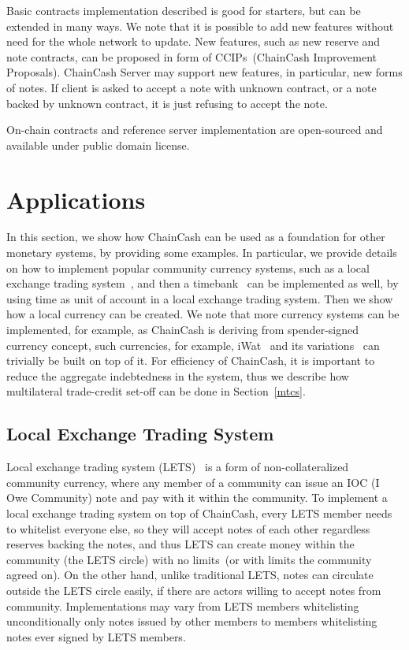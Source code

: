 \documentclass{ifcolog}
\newcommand{\cc}{ChainCash}
\begin{document}

Basic contracts implementation described is good for starters, but can be extended in many ways.  We note that it is possible
to add new features without need for the whole network to update. New features, such as new reserve and note contracts,
can be proposed in form of CCIPs~(ChainCash Improvement Proposals). ChainCash
Server may support new features, in particular, new forms of notes. If client is asked to accept a note with unknown
contract, or a note backed by unknown contract, it is just refusing to accept the note.

On-chain contracts and reference server implementation are open-sourced and available under public domain license.

\section{Applications}
\label{sec-apps}

In this section, we show how \cc{} can be used as a foundation for other monetary systems, by providing some examples.
In particular, we provide details on how to implement popular community currency systems, such as a local exchange trading
 system~\cite{williams1996new}, and then a timebank~\cite{mcquaid2004review} can be implemented as well, by using time
as unit of account in a local exchange trading system. Then we show how a local currency can be created. We note that more currency systems can be
implemented, for example, as \cc{} is deriving from spender-signed currency concept, such currencies, for example,
iWat~\cite{saito2003peer} and its variations~\cite{saito2005wot,saito2005multiplication,saito2006reduction} can
trivially be built on top of it. For efficiency of \cc{}, it is important to reduce the aggregate indebtedness in the system,
thus we describe how multilateral trade-credit set-off can be done in Section~\ref{mtcs}.

\subsection{Local Exchange Trading System}

Local exchange trading system (LETS)~\cite{williams1996new} is a form of non-collateralized community currency, where any member of a community
can issue an IOC (I Owe Community) note and pay with it within the community.
To implement a local exchange trading system on top of \cc{}, every LETS member needs to whitelist everyone else, so
they will accept notes of each other regardless reserves backing the notes, and thus LETS can create money within the community (the LETS circle) with no limits~(or with limits the community agreed on). On the other hand, unlike traditional LETS, notes can circulate outside the LETS circle easily, if there are actors willing to accept notes from community. Implementations may vary from LETS members whitelisting unconditionally only notes issued by other members to members whitelisting notes ever signed by LETS members.
\end{document}
